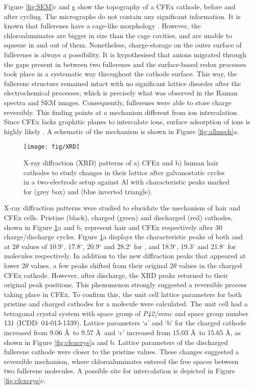 \documentclass{article}
\begin{document}
Figure \ref{fig:SEM}c and g show the topography of a CFEx cathode, before and after cycling. The micrographs do not contain any significant information. It is known that fullerenes have a cage-like morphology \cite{kroto_c60_1985}. However, the chloroaluminates are bigger in size than the cage cavities, and are unable to squeeze in and out of them. Nonetheless, charge-storage on the outer surface of fullerenes is always a possibility. It is hypothesised that  anions migrated through the gaps present in between two fullerenes and the surface-based redox processes took place in a systematic way throughout the cathode surface. This way, the fullerene structure remained intact with no significant lattice disorder after the electrochemical processes; which is precisely what was observed in the Raman spectra and SEM images. Consequently, fullerenes were able to store charge reversibly. This finding points at a mechanism different from ion intercalation. Since CFEx lacks graphitic planes to intercalate ions, surface adsorption of ions is highly likely \cite{adams_van_1994}. A schematic of the mechanism is shown in Figure \ref{fig:allmech}a. 

\begin{figure}%
  \centering
  \texttt{[image: fig/XRD]}
    \caption{X-ray diffraction (XRD) patterns of a) CFEx and b) human hair cathodes to study changes in their lattice after galvanostatic cycles in a two-electrode setup against Al with characteristic peaks marked for  (grey box) and  (blue inverted triangle).}
  \label{fig:XRD}
\end{figure}

X-ray diffraction patterns were studied to elucidate the mechanism of hair and CFEx cells. Pristine (black), charged (green) and discharged (red) cathodes, shown in Figure \ref{fig:XRD}a and b, represent hair and CFEx respectively after 30 charge/discharge cycles. Figure \ref{fig:XRD}a displays the characteristic peaks of both  and  at 2$\theta$ values of 10.9$^{\circ}$, 17.8$^{\circ}$, 20.9$^{\circ}$ and 28.2$^{\circ}$ for , and 18.9$^{\circ}$, 19.3$^{\circ}$ and 21.8$^{\circ}$ for  molecules respectively. In addition to the new diffraction peaks that appeared at lower 2$\theta$ values, a few peaks shifted from their original 2$\theta$ values in the charged CFEx cathode. However, after discharge, the XRD peaks returned to their original peak positions. This phenomenon strongly suggested a reversible process taking place in CFEx. To confirm this, the unit cell lattice parameters for both pristine and charged cathodes for a  molecule were calculated. The unit cell had a tetragonal crystal system with space group of \textit{P42/mmc} and space group number 131 (ICDD: 04-013-1339). Lattice parameters `a' and `b' for the charged cathode increased from 9.06 \AA\ to 9.57 \AA\ and `c' increased from 15.03 \AA\ to 15.65 \AA, as shown in Figure \ref{fig:cfexcrys}a and b. Lattice parameters of the discharged fullerene cathode were closer to the pristine values. These changes suggested a reversible mechanism, where chloroaluminates entered the free spaces between two fullerene molecules. A possible site for  intercalation is depicted in Figure \ref{fig:cfexcrys}c. 
\end{document}

